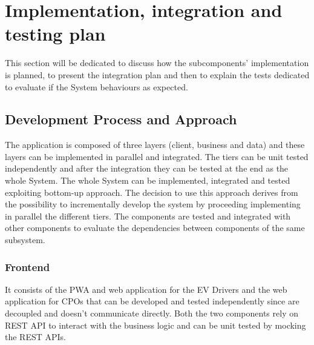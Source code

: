 \section{Implementation, integration and testing plan}
This section will be dedicated to discuss how the subcomponents' implementation is planned, to present the integration plan and then
to explain the tests dedicated to evaluate if the System behaviours as expected. 
\subsection{Development Process and Approach}
The application is composed of three layers (client, business and data) and these layers can be implemented in parallel and integrated.
The tiers can be unit tested independently and after the integration they can be tested at the end as the whole System.
The whole System can be implemented, integrated and tested exploiting bottom-up approach. The decision to use this approach derives
from the possibility to incrementally develop the system by proceeding implementing in parallel the different tiers. 
The components are tested and integrated with other components to evaluate the dependencies between components of the same subsystem.

\subsubsection{Frontend}
It consists of the PWA and web application for the EV Drivers and the web application for CPOs that can be developed and tested independently
since are decoupled and doesn't communicate directly. Both the two components rely on REST API to interact with the business logic and can be unit tested by mocking 
the REST APIs. 
